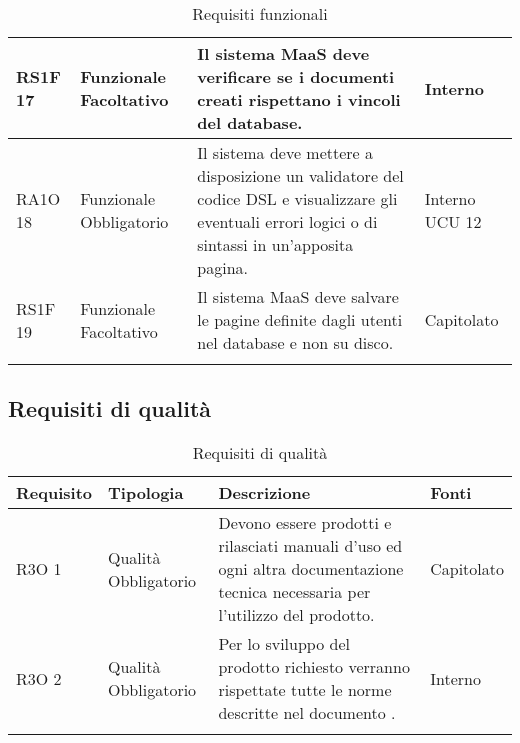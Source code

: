 \begin{center}
\begin{longtable}{ | l | p{2cm} | p{5cm} | p{1.7cm} |}
				RS1F 17 & Funzionale \newline  Facoltativo  & Il sistema MaaS deve verificare se i documenti creati rispettano i vincoli del database. &  Interno \newline  \\ \hline      
				RA1O 18 & Funzionale \newline  Obbligatorio  & Il sistema deve mettere a disposizione un validatore del codice DSL e visualizzare gli eventuali errori logici o di sintassi in un'apposita pagina. &  Interno \newline  UCU 12 \newline  \\ \hline      
				RS1F 19 & Funzionale \newline  Facoltativo  & Il sistema MaaS deve salvare le pagine definite dagli utenti nel database e non su disco. &  Capitolato \newline  \\ \hline
			\caption{Requisiti funzionali}
			\end{longtable}
			\egroup
			\end{center}  
\clearpage

\subsection{Requisiti di qualità }

			\begin{center}
			\bgroup
			\def\arraystretch{1.8}
			\begin{longtable}{ | l | p{2cm} | p{5cm} | p{1.7cm} |}
		
			\cellcolor[gray]{0.9} \textbf{Requisito} & \cellcolor[gray]{0.9} \textbf{Tipologia} 
			& \cellcolor[gray]{0.9} \textbf{Descrizione} & \cellcolor[gray]{0.9} \textbf{Fonti} \\ \hline
      
				R3O 1 & Qualità \newline  Obbligatorio  & Devono essere prodotti e rilasciati manuali d'uso ed ogni altra documentazione tecnica necessaria per l’utilizzo del prodotto. &  Capitolato \newline  \\ \hline      
				R3O 2 & Qualità \newline  Obbligatorio  & Per lo sviluppo del prodotto richiesto verranno rispettate tutte le norme descritte nel documento \NormeDiProgetto{}. &  Interno \newline  \\ \hline
			\caption{Requisiti di qualità}
			\end{longtable}
			\egroup
			\end{center}  
\clearpage

